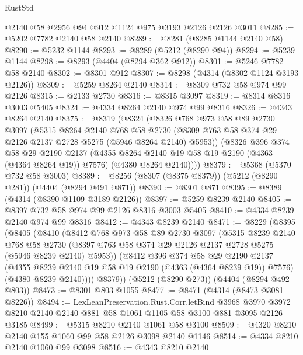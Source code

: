 \begin{lexlean}{RustStd}
\begin{coremodule}
    @2140
    @58
    @2956
    @94
    @912
    @1124
    @975
    @3193
    @2126
    @2126
    @3011
@8285 := @5202 @7782 @2140 @58 @2140
@8289 := @8281 (@8285 @1144 @2140 @58)
@8290 := @5232 @1144
@8293 := @8289 (@5212 (@8290 @94))
@8294 := @5239 @1144
@8298 := @8293 (@4404 (@8294 @362 @912))
@8301 := @5246 @7782 @58 @2140
@8302 := @8301 @912
@8307 := @8298 (@4314 (@8302 @1124 @3193 @2126))
@8309 := @5259 @8264 @2140
@8314 := @8309 @732 @58 @974 @99 @2126
@8315 := @2133 @2730
@8316 := @8315 @3097
@8319 := @8314 @8316 @3003 @5405
@8324 := @4334 @8264 @2140 @974 @99 @8316
@8326 := @4343 @8264 @2140
@8375 := @8319
    (@8324
      (@8326
        @768
        @973
        @58
        @89
        @2730
        @3097
        (@5315
          @8264
          @2140
          @768
          @58
          @2730
          (@8309 @763 @58 @374 @29 @2126 @2137 @2728 @5275 (@5946 @8264 @2140) @5953))
        (@8326
          @396
          @374
          @58
          @29
          @2190
          @2137
          (@4355 @8264 @2140 @19 @58 @19 @2190 (@4363 (@4364 @8264 @19)) @7576)
          (@4380 @8264 @2140))))
@8379 := @5368 (@5370 @732 @58 @3003)
@8389 := @8256 (@8307 (@8375 @8379)) (@5212 (@8290 @281)) (@4404 (@8294 @491 @871))
@8390 := @8301 @871
@8395 := @8389 (@4314 (@8390 @1109 @3189 @2126))
@8397 := @5259 @8239 @2140
@8405 := @8397 @732 @58 @974 @99 @2126 @8316 @3003 @5405
@8410 := @4334 @8239 @2140 @974 @99 @8316
@8412 := @4343 @8239 @2140
@8471 := @8229
    (@8395
      (@8405
        (@8410
          (@8412
            @768
            @973
            @58
            @89
            @2730
            @3097
            (@5315
              @8239
              @2140
              @768
              @58
              @2730
              (@8397 @763 @58 @374 @29 @2126 @2137 @2728 @5275 (@5946 @8239 @2140) @5953))
            (@8412
              @396
              @374
              @58
              @29
              @2190
              @2137
              (@4355 @8239 @2140 @19 @58 @19 @2190 (@4363 (@4364 @8239 @19)) @7576)
              (@4380 @8239 @2140))))
        @8379))
    (@5212 (@8290 @273))
    (@4404 (@8294 @492 @803))
@8473 := @8301 @803 @1055
@8477 := @8471 (@4314 (@8473 @3081 @8226))
@8494 := LexLeanPreservation.Rust.Corr.letBind
    @3968
    @3970
    @3972
    @8210
    @2140
    @2140
    @881
    @58
    @1061
    @1105
    @58
    @3100
    @881
    @3095
    @2126
    @3185
@8499 := @5315 @8210 @2140 @1061 @58 @3100
@8509 := @4320 @8210 @2140 @155 @1060 @99 @58 @2126 @3098 @2140 @1146
@8514 := @4334 @8210 @2140 @1060 @99 @3098
@8516 := @4343 @8210 @2140

\end{coremodule}
\end{lexlean}
